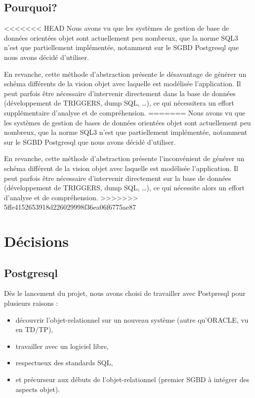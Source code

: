 	\subsection{Pourquoi?}
<<<<<<< HEAD
    Nous avons vu que les systèmes de gestion de base de données orientées objet sont actuellement peu nombreux, que la norme SQL3 n'est que partiellement implémentée, notamment sur le SGBD Postgresql que nous avons décidé d'utiliser.
    
En revanche, cette méthode d'abstraction présente le désavantage de générer un schéma différents de la vision objet avec laquelle est modélisée l'application. Il peut parfois être nécessaire d'intervenir directement dans la base de données (développement de TRIGGERS, dump SQL, \ldots), ce qui nécessitera un effort supplémentaire d'analyse et de compréhension.
=======
    Nous avons vu que les systèmes de gestion de bases de données orientées objet sont actuellement peu nombreux, que la norme SQL3 n'est que partiellement implémentée, notamment sur le SGBD Postgresql que nous avons décidé d'utiliser.
    
En revanche, cette méthode d'abstraction présente l'inconvénient de générer un schéma différent de la vision objet avec laquelle est modélisée l'application. Il peut parfois être nécessaire d'intervenir directement sur la base de données (développement de TRIGGERS, dump SQL, \ldots), ce qui nécessite alors un effort d'analyse et de compréhension.
>>>>>>> 5ffe4152653918d226029998f36ea06f6775ae87

\section{Décisions}

\subsection{Postgresql}

Dès le lancement du projet, nous avons choisi de travailler avec Postpresql pour plusieurs raisons :
\begin{itemize}
\item découvrir l'objet-relationnel sur un nouveau système (autre qu'ORACLE, vu en TD/TP),
\item travailler avec un logiciel libre,
\item respectueux des standards SQL,
\item et précurseur aux débuts de l'objet-relationnel (premier SGBD à intégrer des aspects objet).
\end{itemize}

